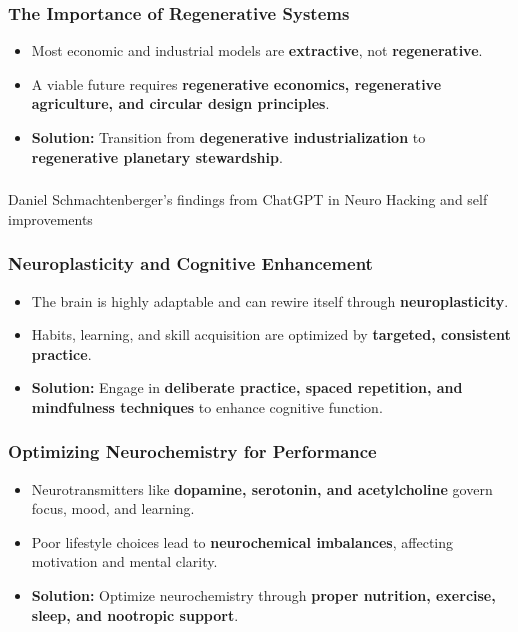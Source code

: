 \begin{frame}[fragile]\frametitle{The Importance of Regenerative Systems}
	\begin{itemize}
	\item Most economic and industrial models are \textbf{extractive}, not \textbf{regenerative}.
	\item A viable future requires \textbf{regenerative economics, regenerative agriculture, and circular design principles}.
	\item \textbf{Solution:} Transition from \textbf{degenerative industrialization} to \textbf{regenerative planetary stewardship}.
	\end{itemize}
\end{frame}

\begin{frame}[fragile]\frametitle{}
\begin{center}
{\Large Daniel Schmachtenberger's findings from ChatGPT in Neuro Hacking and self improvements}

\end{center}
\end{frame}

\begin{frame}[fragile]\frametitle{Neuroplasticity and Cognitive Enhancement}
	\begin{itemize}
	\item The brain is highly adaptable and can rewire itself through \textbf{neuroplasticity}.
	\item Habits, learning, and skill acquisition are optimized by \textbf{targeted, consistent practice}.
	\item \textbf{Solution:} Engage in \textbf{deliberate practice, spaced repetition, and mindfulness techniques} to enhance cognitive function.
	\end{itemize}
\end{frame}

\begin{frame}[fragile]\frametitle{Optimizing Neurochemistry for Performance}
	\begin{itemize}
	\item Neurotransmitters like \textbf{dopamine, serotonin, and acetylcholine} govern focus, mood, and learning.
	\item Poor lifestyle choices lead to \textbf{neurochemical imbalances}, affecting motivation and mental clarity.
	\item \textbf{Solution:} Optimize neurochemistry through \textbf{proper nutrition, exercise, sleep, and nootropic support}.
	\end{itemize}
\end{frame}

